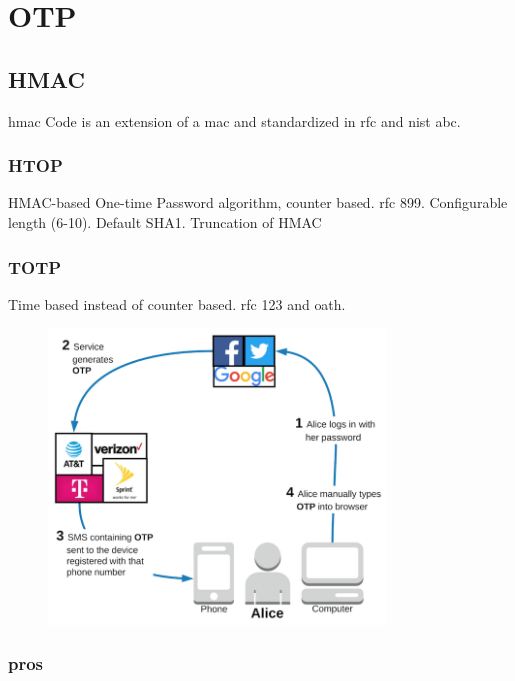 \section{OTP}

\subsection{HMAC}

\gls{hmac} Code is an extension of a \gls{mac} and standardized in \gls{rfc} and \gls{nist} abc.

\subsubsection{HTOP}

HMAC-based One-time Password algorithm, counter based. \gls{rfc} 899. Configurable length (6-10). Default SHA1. Truncation of HMAC

\subsubsection{TOTP}

Time based instead of counter based. \gls{rfc} 123 and \gls{oath}.


\begin{figure}[hbt]
  \centering
\includegraphics[width=0.8\textwidth]{pics/02---authentication-flow-3}
  \caption{}
\end{figure}

\subsubsection{pros}

